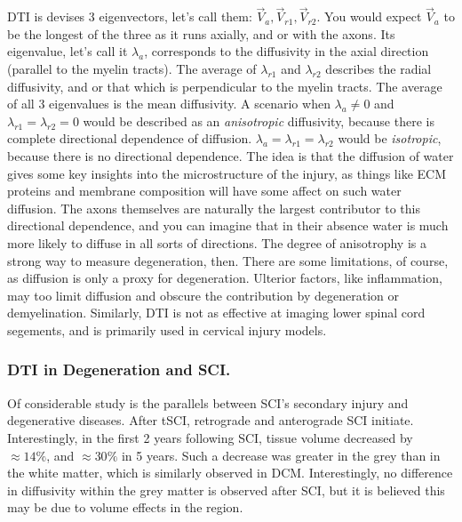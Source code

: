 DTI is devises 3 eigenvectors, let's call them: $\vec{V}_{a}, \vec{V}_{r1}, \vec{V}_{r2}$. You would expect $\vec{V}_{a}$ to be the longest of the three as it runs axially, and or with the axons. Its eigenvalue, let's call it $\lambda_a$, corresponds to the diffusivity in the axial direction (parallel to the myelin tracts). The average of $\lambda_{r1}$ and $\lambda_{r2}$ describes the radial diffusivity, and or that which is perpendicular to the myelin tracts. The average of all 3 eigenvalues is the mean diffusivity. A scenario when $\lambda_a \neq 0$ and $\lambda_{r1} = \lambda_{r2} = 0$ would be described as an \textit{anisotropic} diffusivity, because there is complete directional dependence of diffusion. $\lambda_a = \lambda_{r1} = \lambda_{r2}$ would be \textit{isotropic}, because there is no directional dependence. The idea is that the diffusion of water gives some key insights into the microstructure of the injury, as things like ECM proteins and membrane composition will have some affect on such water diffusion. The axons themselves are naturally the largest contributor to this directional dependence, and you can imagine that in their absence water is much more likely to diffuse in all sorts of directions. The degree of anisotrophy is a strong way to measure degeneration, then. There are some limitations, of course, as diffusion is only a proxy for degeneration. Ulterior factors, like inflammation, may too limit diffusion and obscure the contribution by degeneration or demyelination. Similarly, DTI is not as effective at imaging lower spinal cord segements, and is primarily used in cervical injury models.

\subsubsection{DTI in Degeneration and SCI.}

Of considerable study is the parallels between SCI's secondary injury and degenerative diseases. After tSCI, retrograde and anterograde SCI initiate. Interestingly, in the first 2 years following SCI, tissue volume decreased by $\approx 14\%$, and $\approx 30\%$ in 5 years. Such a decrease was greater in the grey than in the white matter, which is similarly observed in DCM. Interestingly, no difference in diffusivity within the grey matter is observed after SCI, but it is believed this may be due to volume effects in the region.\newline

